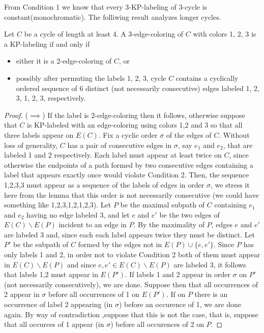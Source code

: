 \documentclass[12pt,a4paper,titlepage,openany]{report}
\begin{document}
From Condition 1 we know that every 3-KP-labeling of 3-cycle is constant(monochromatic). The folliwing result analyzes longer cycles.
\begin{lemma}
Let $C$ be a cycle of length at least 4. A 3-edge-coloring of $C$ with colors 1, 2, 3 is a KP-labeling if and only if
\begin{itemize}
\item either it is a 2-edge-coloring of $C$, or
\item possibly after permuting the labels 1, 2, 3, cycle $C$ contains a cyclically ordered sequence
of 6 distinct (not necessarily consecutive) edges labeled 1, 2, 3, 1, 2, 3, respectively. 
\end{itemize}
\end{lemma}

\begin{proof}
($\implies$) If the label is 2-edge-coloring then it follows, otherwise suppose that $C$ is KP-labeled with an edge-coloring using colors 1,2 and 3 so that all three labels appear on $E(C)$. Fix a cyclic order $\sigma$ of the edges of $C$. Without loss of generality, $C$ has a pair of consecutive edges in $\sigma$, say $e_1$ and $e_2$, that are labeled 1 and 2 respectively. Each label must appear at least twice on $C$, since otherwise the endpoints of a path formed by two consecutive edges containing a label that appears exactly once would violate Condition 2. Then, the sequence 1,2,3,3 must appear as a sequence of the labels of edges in order $\sigma$, we stress it here from the lemma that this order is not necessarily consecutive (we could have something like 1,2,3,1,2,1,2,3). Let $P$ be the maximal subpath of $C$ containing $e_1$ and $e_2$ having no edge labeled 3, and let $e$ and $e'$ be the two edges of $E(C)\backslash E(P)$ incident to an edge in $P$. By the maximality of $P$, edges $e$ and $e'$ are labeled 3 and, since each each label appears twice they must be distinct. Let $P'$ be the subpath of $C$ formed by the edges not in $E(P)\cup \{ e,e'\}$. Since $P$ has only labels 1 and 2, in order not to violate Condition 2 both of them must appear in $E(C)\backslash E(P)$ and since $e,e' \in E(C)\backslash E(P)$ are labeled 3, it follows that labels 1,2 must appear in $E(P')$. If labels 1 and 2 appear in order $\sigma$ on $P'$ (not necessarily consecutively), we are done. Suppose then that all occurrences of 2 appear in $\sigma$ before all occurrences of 1 on $E(P')$. If on $P$ there is an occurrence of label 2 appearing (in $\sigma$) before an occurence of 1, we are done again. By way of contradiction  ,suppose that this is not the case, that is, suppose that all occurces of 1 appear (in $\sigma$) before all occurences of 2 on $P$. \newline

\end{proof}
\end{document}
